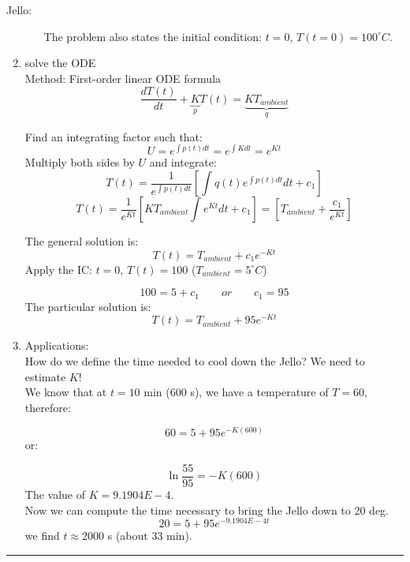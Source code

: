 \begin{exmp}{Jello:}
\begin{enumerate}
\begin{itemize}
The problem also states the initial condition:  $t=0$, $T(t=0)=100^\circ C$.
\end{itemize}

\item {solve the ODE}\\
Method: First-order linear ODE formula\\
\begin{equation*}
 \frac{dT(t)}{dt}+\underbrace{K}_{p}T(t)=\underbrace{K T_{ambient}}_{q}
\end{equation*}

Find an integrating factor such that:
\begin{equation*}
 U=e^{\int p(t) dt}=e^{\int K dt}=e^{Kt}
 \end{equation*}
Multiply both sides by $U$ and integrate:
\begin{equation*}
 T(t)=\frac{1}{e^{\int p(t) dt}}\left[\int q(t)e^{\int p(t) dt} dt+c_1\right]
 \end{equation*}
\begin{equation*}
 T(t)=\frac{1}{e^{Kt}}\left[K T_{ambient} \int {e^{Kt}} dt+c_1\right]=\left[  T_{ambient} +\frac{c_1}{e^{Kt}}\right]
 \end{equation*}

The general solution is:
\begin{equation*}
 \boxed{T(t)=T_{ambient} +c_1 e^{-Kt}}
\end{equation*}
Apply the IC: $t=0$, $T(t)=100$ ($T_{ambient}=5^\circ C$)


\begin{equation*}
100=5 +c_1  \qquad or \qquad c_1=95
\end{equation*}
The particular solution is:
\begin{equation*}
 \boxed{T(t)=T_{ambient} +95 e^{-Kt}}
\end{equation*}

\item Applications:\\
How do we define the time needed to cool down the Jello? We need to estimate $K$!\\
We know that at $t=10$  min (600 s), we have a temperature of $T=60$, therefore:

\begin{equation*}
 60=5 +95 e^{-K(600)}
\end{equation*}
or:

\begin{equation*}
 \ln{\frac{55}{95}} = -K(600)
\end{equation*}
The value of $K=9.1904 E-4$.\\
Now we can compute the time necessary to bring the Jello down to 20 deg.
\begin{equation*}
 20=5 +95 e^{- 9.1904 E-4 t}
\end{equation*}
we find $t\approx 2000$ s (about 33 min).\\
\end{enumerate}


\end{exmp}
\begin{center}
\noindent\rule{4cm}{0.4pt}
\end{center}
